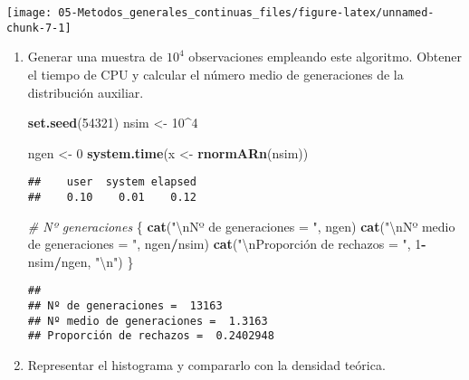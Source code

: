 \documentclass[
]{book}
\newenvironment{Shaded}{\begin{snugshade}}{\end{snugshade}}
\newcommand{\CharTok}[1]{\textcolor[rgb]{0.31,0.60,0.02}{#1}}
\newcommand{\CommentTok}[1]{\textcolor[rgb]{0.56,0.35,0.01}{\textit{#1}}}
\newcommand{\DecValTok}[1]{\textcolor[rgb]{0.00,0.00,0.81}{#1}}
\newcommand{\KeywordTok}[1]{\textcolor[rgb]{0.13,0.29,0.53}{\textbf{#1}}}
\newcommand{\NormalTok}[1]{#1}
\newcommand{\OperatorTok}[1]{\textcolor[rgb]{0.81,0.36,0.00}{\textbf{#1}}}
\newcommand{\StringTok}[1]{\textcolor[rgb]{0.31,0.60,0.02}{#1}}
\theoremstyle{break}
\theoremstyle{definition}
\theoremstyle{definition}
\theoremstyle{definition}
\theoremstyle{remark}
\begin{document}
\begin{center}\texttt{[image: 05-Metodos\_generales\_continuas\_files/figure-latex/unnamed-chunk-7-1]} \end{center}

\begin{enumerate}
\def\labelenumi{\alph{enumi})}
\item
  Generar una muestra de \(10^{4}\) observaciones empleando este
  algoritmo. Obtener el tiempo de CPU y calcular el número medio
  de generaciones de la distribución auxiliar.

\begin{Shaded}
\begin{Highlighting}[]
\KeywordTok{set.seed}\NormalTok{(}\DecValTok{54321}\NormalTok{)}
\NormalTok{nsim <-}\StringTok{ }\DecValTok{10}\OperatorTok{^}\DecValTok{4}

\NormalTok{ngen <-}\StringTok{ }\DecValTok{0}
\KeywordTok{system.time}\NormalTok{(x <-}\StringTok{ }\KeywordTok{rnormARn}\NormalTok{(nsim))}
\end{Highlighting}
\end{Shaded}

\begin{verbatim}
##    user  system elapsed 
##    0.10    0.01    0.12
\end{verbatim}

\begin{Shaded}
\begin{Highlighting}[]
\CommentTok{# Nº generaciones}
\NormalTok{\{}
\KeywordTok{cat}\NormalTok{(}\StringTok{"}\CharTok{\textbackslash{}n}\StringTok{Nº de generaciones = "}\NormalTok{, ngen)}
\KeywordTok{cat}\NormalTok{(}\StringTok{"}\CharTok{\textbackslash{}n}\StringTok{Nº medio de generaciones = "}\NormalTok{, ngen}\OperatorTok{/}\NormalTok{nsim)}
\KeywordTok{cat}\NormalTok{(}\StringTok{"}\CharTok{\textbackslash{}n}\StringTok{Proporción de rechazos = "}\NormalTok{, }\DecValTok{1}\OperatorTok{-}\NormalTok{nsim}\OperatorTok{/}\NormalTok{ngen, }\StringTok{"}\CharTok{\textbackslash{}n}\StringTok{"}\NormalTok{)}
\NormalTok{\}}
\end{Highlighting}
\end{Shaded}

\begin{verbatim}
## 
## Nº de generaciones =  13163
## Nº medio de generaciones =  1.3163
## Proporción de rechazos =  0.2402948
\end{verbatim}
\item
  Representar el histograma y compararlo con la densidad teórica.


\end{enumerate}
\end{document}
